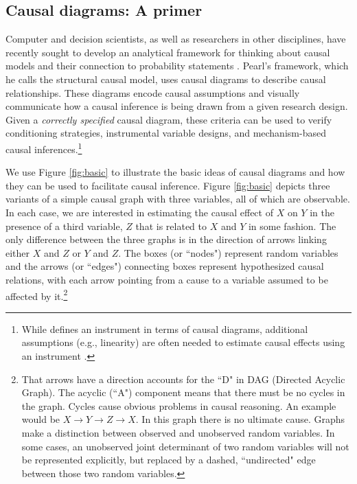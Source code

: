 \documentclass[11pt,reqno,titlepage]{amsart}
\begin{document}
\begin{doublespace}
\subsection{Causal diagrams: A primer}
Computer and decision scientists, as well as researchers in other disciplines, have recently sought to develop an analytical framework for thinking about causal models and their connection to probability statements \citep{Pearl:2009kh}.
Pearl's framework, which he calls the structural causal model, uses causal diagrams to describe causal relationships. 
These diagrams encode causal assumptions and visually communicate how a causal inference is being drawn from a given research design.
Given a \emph{correctly specified} causal diagram, these criteria can be used to verify conditioning strategies, instrumental variable designs, and mechanism-based causal inferences.\footnote{While \citet[p.248]{Pearl:2009kh} defines an instrument in terms of causal diagrams, additional assumptions (e.g., linearity) are often needed to estimate causal effects using an instrument \citep{Angrist:1996p7456}.}

We use Figure \ref{fig:basic} to illustrate the basic ideas of causal diagrams and how they can be used to facilitate causal inference.
Figure \ref{fig:basic} depicts three variants of a simple causal graph with three variables, all of which are observable.
In each case, we are interested in estimating the causal effect of $X$ on $Y$ in the presence of a third variable, $Z$ that is related to $X$ and $Y$ in some fashion.
The only difference between the three graphs is in the direction of arrows linking either $X$ and $Z$ or $Y$ and $Z$.
The boxes (or ``nodes") represent random variables and the arrows (or ``edges") connecting boxes represent hypothesized causal relations, with each arrow pointing from a cause to a variable assumed to be affected by it.\footnote{
That arrows have a direction accounts for the ``D" in DAG (Directed Acyclic Graph). 
The acyclic (``A") component means that there must be no cycles in the graph. 
Cycles cause obvious problems in causal reasoning.
 An example would be $X \rightarrow Y \rightarrow Z \rightarrow X$. 
In this graph there is no ultimate cause. 
Graphs make a distinction between observed and unobserved random variables.
In some cases, an unobserved joint determinant of two random variables will not be represented explicitly, but replaced by a dashed, ``undirected" edge between those two random variables.}


\end{doublespace}
\end{document}
